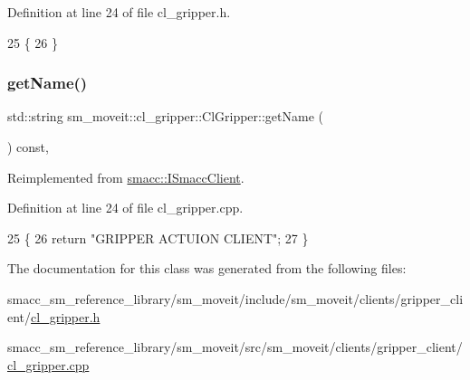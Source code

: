 Definition at line 24 of file cl\+\_\+gripper.\+h.


\begin{DoxyCode}
25   \{
26   \}
\end{DoxyCode}
\mbox{\label{classsm__moveit_1_1cl__gripper_1_1ClGripper_a71ee172824d9eb24c9a386ea6d8822ea}} 
\subsubsection{\texorpdfstring{get\+Name()}{getName()}}
{\footnotesize\ttfamily std\+::string sm\+\_\+moveit\+::cl\+\_\+gripper\+::\+Cl\+Gripper\+::get\+Name (\begin{DoxyParamCaption}{ }\end{DoxyParamCaption}) const\hspace{0.3cm}{\ttfamily [override]}, {\ttfamily [virtual]}}



Reimplemented from \hyperlink{classsmacc_1_1ISmaccClient_a8c3ce19f182e71909c5dc6263d25be69}{smacc\+::\+I\+Smacc\+Client}.



Definition at line 24 of file cl\+\_\+gripper.\+cpp.


\begin{DoxyCode}
25 \{
26     \textcolor{keywordflow}{return} \textcolor{stringliteral}{"GRIPPER ACTUION CLIENT"};
27 \}
\end{DoxyCode}


The documentation for this class was generated from the following files\+:\begin{DoxyCompactItemize}
\item 
smacc\+\_\+sm\+\_\+reference\+\_\+library/sm\+\_\+moveit/include/sm\+\_\+moveit/clients/gripper\+\_\+client/\hyperlink{include_2sm__moveit_2clients_2gripper__client_2cl__gripper_8h}{cl\+\_\+gripper.\+h}\item 
smacc\+\_\+sm\+\_\+reference\+\_\+library/sm\+\_\+moveit/src/sm\+\_\+moveit/clients/gripper\+\_\+client/\hyperlink{src_2sm__moveit_2clients_2gripper__client_2cl__gripper_8cpp}{cl\+\_\+gripper.\+cpp}\end{DoxyCompactItemize}
